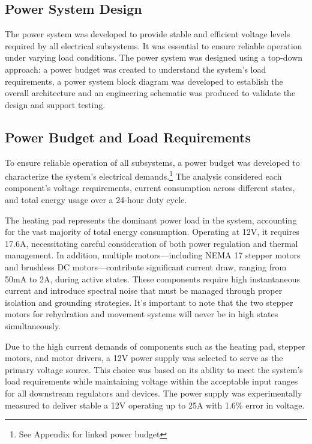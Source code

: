 \documentclass[12pt]{article}
\begin{document}
    \subsection{Power System Design}
    
        The power system was developed to provide stable and efficient voltage levels required by all electrical subsystems. It was essential to ensure reliable operation under varying load conditions. The power system was designed using a top-down approach: a power budget was created to understand the system’s load requirements, a power system block diagram was developed to establish the overall architecture and an engineering schematic was produced to validate the design and support testing.
    
    \subsection{Power Budget and Load Requirements}
    
        To ensure reliable operation of all subsystems, a power budget was developed to characterize the system’s electrical demands.\footnote{See Appendix for linked power budget} The analysis considered each component's voltage requirements, current consumption across different states, and total energy usage over a 24-hour duty cycle. 
        
        
        The heating pad represents the dominant power load in the system, accounting for the vast majority of total energy consumption. Operating at 12V, it requires 17.6A, necessitating careful consideration of both power regulation and thermal management. In addition, multiple motors—including NEMA 17 stepper motors and brushless DC motors—contribute significant current draw, ranging from 50mA to 2A, during active states. These components require high instantaneous current and introduce spectral noise that must be managed through proper isolation and grounding strategies. It's important to note that the two stepper motors for rehydration and movement systems will never be in high states simultaneously.
        
        Due to the high current demands of components such as the heating pad, stepper motors, and motor drivers, a 12V power supply was selected to serve as the primary voltage source. This choice was based on its ability to meet the system’s load requirements while maintaining voltage within the acceptable input ranges for all downstream regulators and devices. The power supply was experimentally measured to deliver stable a 12V operating up to 25A with 1.6\% error in voltage.
    
\end{document}
